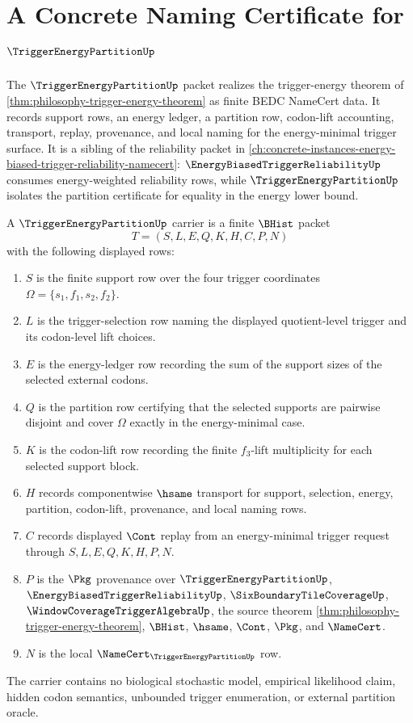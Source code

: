 \chapter{A Concrete Naming Certificate for $\TriggerEnergyPartitionUp$}
\label{ch:concrete-instances-trigger-energy-partition-namecert}

The $\TriggerEnergyPartitionUp$ packet realizes the trigger-energy theorem of \autoref{thm:philosophy-trigger-energy-theorem} as finite BEDC NameCert data. It records support rows, an energy ledger, a partition row, codon-lift accounting, transport, replay, provenance, and local naming for the energy-minimal trigger surface. It is a sibling of the reliability packet in \autoref{ch:concrete-instances-energy-biased-trigger-reliability-namecert}: $\EnergyBiasedTriggerReliabilityUp$ consumes energy-weighted reliability rows, while $\TriggerEnergyPartitionUp$ isolates the partition certificate for equality in the energy lower bound.

\begin{definition}
\label{def:trigger-energy-partition-carrier}
A $\TriggerEnergyPartitionUp$ carrier is a finite $\BHist$ packet
$$
T=(S,L,E,Q,K,H,C,P,N)
$$
with the following displayed rows:
\begin{enumerate}
\item $S$ is the finite support row over the four trigger coordinates $\Omega=\{s_{1},f_{1},s_{2},f_{2}\}$.
\item $L$ is the trigger-selection row naming the displayed quotient-level trigger and its codon-level lift choices.
\item $E$ is the energy-ledger row recording the sum of the support sizes of the selected external codons.
\item $Q$ is the partition row certifying that the selected supports are pairwise disjoint and cover $\Omega$ exactly in the energy-minimal case.
\item $K$ is the codon-lift row recording the finite $f_{3}$-lift multiplicity for each selected support block.
\item $H$ records componentwise $\hsame$ transport for support, selection, energy, partition, codon-lift, provenance, and local naming rows.
\item $C$ records displayed $\Cont$ replay from an energy-minimal trigger request through $S,L,E,Q,K,H,P,N$.
\item $P$ is the $\Pkg$ provenance over $\TriggerEnergyPartitionUp$, $\EnergyBiasedTriggerReliabilityUp$, $\SixBoundaryTileCoverageUp$, $\WindowCoverageTriggerAlgebraUp$, the source theorem \autoref{thm:philosophy-trigger-energy-theorem}, $\BHist$, $\hsame$, $\Cont$, $\Pkg$, and $\NameCert$.
\item $N$ is the local $\NameCert_{\TriggerEnergyPartitionUp}$ row.
\end{enumerate}
The carrier contains no biological stochastic model, empirical likelihood claim, hidden codon semantics, unbounded trigger enumeration, or external partition oracle.
\end{definition}

